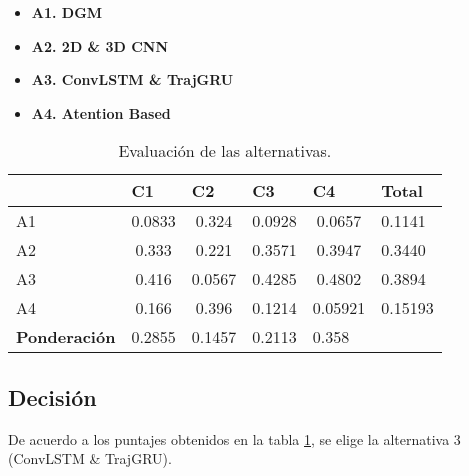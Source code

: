 \begin{itemize}
  \item \textbf{A1. DGM}
  \item \textbf{A2. 2D \& 3D CNN} 
  \item \textbf{A3. ConvLSTM \& TrajGRU} 
  \item \textbf{A4. Atention Based}
\end{itemize}

\begin{table}[H]
  \centering
  \caption{Evaluación de las alternativas.}
  \begin{tabular}{l|ccccl}
  \hline
  \textbf{}            & \multicolumn{1}{l}{C1}     & \multicolumn{1}{l}{C2}     & \multicolumn{1}{l}{C3}     & \multicolumn{1}{l}{C4}    & Total \\ \hline
  A1 & 0.0833 & 0.324  & 0.0928 & 0.0657  & 0.1141  \\
  A2 & 0.333  & 0.221  & 0.3571 & 0.3947  & 0.3440  \\
  A3 & 0.416  & 0.0567 & 0.4285 & 0.4802  & 0.3894  \\
  A4 & 0.166  & 0.396  & 0.1214 & 0.05921 & 0.15193 \\ \hline
  \textbf{Ponderación} & \multicolumn{1}{l}{0.2855} & \multicolumn{1}{l}{0.1457} & \multicolumn{1}{l}{0.2113} & \multicolumn{1}{l}{0.358} &       \\ \hline
  \end{tabular}
  \label{tab:evaluacion}

\end{table}

\subsection{Decisión}

De acuerdo a los puntajes obtenidos en la tabla \ref{tab:evaluacion}, se elige 
la alternativa 3 (ConvLSTM \& TrajGRU).
